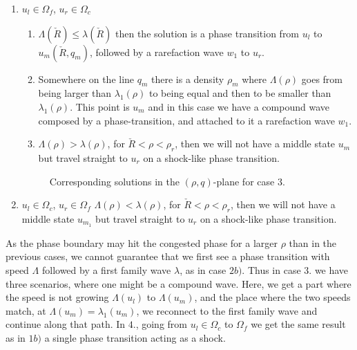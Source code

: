 \documentclass[10pt]{article}
\numberwithin{equation}{section}
\begin{document}
\begin{enumerate}
\item $u_l \in \Omega_f$, $u_r \in \Omega_c$ 
    \begin{enumerate}
    \item $\Lambda(\check R) \leq \lambda(\check R)$ then the solution is a phase transition from $u_l$ to $u_{m}(\check R, q_m)$, followed by a rarefaction wave $w_1$ to $u_r$. 
    \item Somewhere on the line $q_m$ there is a density $\rho_m$ where $\Lambda(\rho)$ goes from being larger than $\lambda_1(\rho)$ to being equal and then to be smaller than $\lambda_1(\rho)$. This point is $u_{m}$ and in this case we have a compound wave composed by a phase-transition, and attached to it a rarefaction wave $w_1$. 
    \item $ \Lambda( \rho) > \lambda(\rho)$, for $\check R < \rho < \rho_r$, then we will not have a middle state $u_{m}$ but travel straight to $u_r$ on a shock-like phase transition.
    \end{enumerate}
\begin{figure}[H]
    \centering
    
    \caption{Corresponding solutions in the $(\rho, q)$-plane for case $3.$}
    \label{fig:PhTComplexCase1}
\end{figure}
 
\item $u_l \in \Omega_c$, $u_r \in \Omega_f$ \newline
     $ \Lambda( \rho) < \lambda(\rho)$, for $\check R < \rho < \rho_r$, then we will not have a middle state $u_{m_1}$ but travel straight to $u_r$ on a shock-like phase transition.
\end{enumerate}

As the phase boundary may hit the congested phase for a larger $\rho$ than in the previous cases, we cannot guarantee that we first see a phase transition with speed $\Lambda$ followed by a first family wave $\lambda$, as in case $2b)$. Thus in case $3.$ we have three scenarios, where one might be a compound wave. Here, we get a part where the speed is not growing $\Lambda(u_l)$ to $\Lambda(u_m)$, and the place where the two speeds match, at $\Lambda(u_m) = \lambda_1(u_m)$, we reconnect to the first family wave and continue along that path. In $4.$, going from $u_l \in \Omega_c$ to $\Omega_f$ we get the same result as in $1b)$ a single phase transition acting as a shock. 
 
\end{document}
